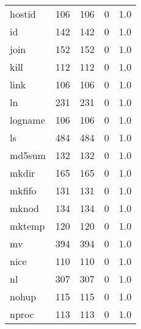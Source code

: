 \begin{tabular}{lrrrr}
hostid    &                     106 &              106 &                 0 &                          1.0 \\
id        &                     142 &              142 &                 0 &                          1.0 \\
join      &                     152 &              152 &                 0 &                          1.0 \\
kill      &                     112 &              112 &                 0 &                          1.0 \\
link      &                     106 &              106 &                 0 &                          1.0 \\
ln        &                     231 &              231 &                 0 &                          1.0 \\
logname   &                     106 &              106 &                 0 &                          1.0 \\
ls        &                     484 &              484 &                 0 &                          1.0 \\
md5sum    &                     132 &              132 &                 0 &                          1.0 \\
mkdir     &                     165 &              165 &                 0 &                          1.0 \\
mkfifo    &                     131 &              131 &                 0 &                          1.0 \\
mknod     &                     134 &              134 &                 0 &                          1.0 \\
mktemp    &                     120 &              120 &                 0 &                          1.0 \\
mv        &                     394 &              394 &                 0 &                          1.0 \\
nice      &                     110 &              110 &                 0 &                          1.0 \\
nl        &                     307 &              307 &                 0 &                          1.0 \\
nohup     &                     115 &              115 &                 0 &                          1.0 \\
nproc     &                     113 &              113 &                 0 &                          1.0 \\

\end{tabular}
